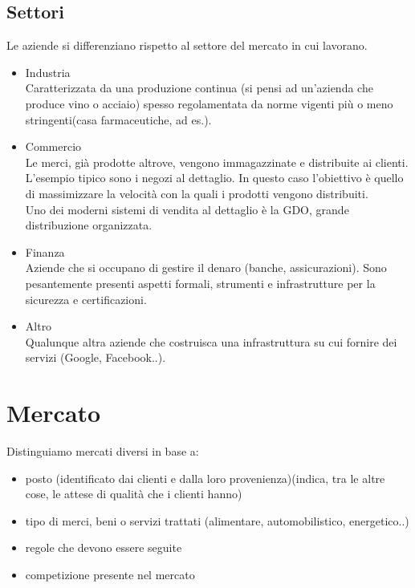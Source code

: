\subsection{Settori}
Le aziende si differenziano rispetto al settore del mercato in cui lavorano.
\begin{itemize}
\item Industria \\
			Caratterizzata da una produzione continua (si pensi ad un'azienda che produce vino o acciaio) spesso regolamentata da norme vigenti pi\`u o meno stringenti(casa farmaceutiche, ad es.).
\item Commercio \\
			Le merci, gi\`a prodotte altrove, vengono immagazzinate e distribuite ai clienti. L'esempio tipico sono i negozi al dettaglio. In questo caso l'obiettivo \`e quello di massimizzare la velocit\`a con la quali i prodotti vengono distribuiti. \\
Uno dei moderni sistemi di vendita al dettaglio \`e la \textsf{GDO}, grande distribuzione organizzata.
\item Finanza \\
			Aziende che si occupano di gestire il denaro (banche, assicurazioni). Sono pesantemente presenti aspetti formali, strumenti e infrastrutture per la sicurezza e certificazioni.
\item Altro \\
			Qualunque altra aziende che costruisca una infrastruttura su cui fornire dei servizi (Google, Facebook..).
\end{itemize}

\section{Mercato}
Distinguiamo mercati diversi in base a:
\begin{itemize}
\item posto (identificato dai clienti e dalla loro provenienza)(indica, tra le altre cose, le attese di qualit\`a che i clienti hanno)
\item tipo di merci, beni o servizi trattati (alimentare, automobilistico, energetico..)
\item regole che devono essere seguite
\item competizione presente nel mercato
\end{itemize}


